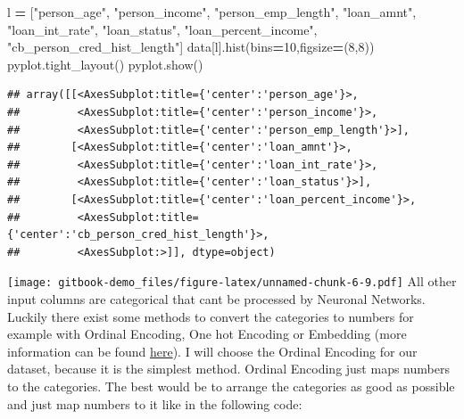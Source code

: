 \documentclass[
]{book}
\newenvironment{Shaded}{\begin{snugshade}}{\end{snugshade}}
\newcommand{\DecValTok}[1]{\textcolor[rgb]{0.00,0.00,0.81}{#1}}
\newcommand{\NormalTok}[1]{#1}
\newcommand{\OperatorTok}[1]{\textcolor[rgb]{0.81,0.36,0.00}{\textbf{#1}}}
\newcommand{\StringTok}[1]{\textcolor[rgb]{0.31,0.60,0.02}{#1}}
\begin{document}
\begin{Shaded}
\begin{Highlighting}[]
\NormalTok{l }\OperatorTok{=}\NormalTok{ [}\StringTok{"person\_age"}\NormalTok{, }\StringTok{"person\_income"}\NormalTok{, }\StringTok{"person\_emp\_length"}\NormalTok{, }\StringTok{"loan\_amnt"}\NormalTok{, }\StringTok{"loan\_int\_rate"}\NormalTok{, }\StringTok{"loan\_status"}\NormalTok{, }\StringTok{"loan\_percent\_income"}\NormalTok{, }\StringTok{"cb\_person\_cred\_hist\_length"}\NormalTok{]}
\NormalTok{data[l].hist(bins}\OperatorTok{=}\DecValTok{10}\NormalTok{,figsize}\OperatorTok{=}\NormalTok{(}\DecValTok{8}\NormalTok{,}\DecValTok{8}\NormalTok{))}
\NormalTok{pyplot.tight\_layout()}
\NormalTok{pyplot.show()}
\end{Highlighting}
\end{Shaded}

\begin{verbatim}
## array([[<AxesSubplot:title={'center':'person_age'}>,
##         <AxesSubplot:title={'center':'person_income'}>,
##         <AxesSubplot:title={'center':'person_emp_length'}>],
##        [<AxesSubplot:title={'center':'loan_amnt'}>,
##         <AxesSubplot:title={'center':'loan_int_rate'}>,
##         <AxesSubplot:title={'center':'loan_status'}>],
##        [<AxesSubplot:title={'center':'loan_percent_income'}>,
##         <AxesSubplot:title={'center':'cb_person_cred_hist_length'}>,
##         <AxesSubplot:>]], dtype=object)
\end{verbatim}

\texttt{[image: gitbook-demo\_files/figure-latex/unnamed-chunk-6-9.pdf]}
All other input columns are categorical that cant be processed by Neuronal Networks. Luckily there exist some methods to convert the categories to numbers for example with Ordinal Encoding, One hot Encoding or Embedding (more information can be found \href{https://machinelearningmastery.com/how-to-prepare-categorical-data-for-deep-learning-in-python/}{here}). I will choose the Ordinal Encoding for our dataset, because it is the simplest method. Ordinal Encoding just maps numbers to the categories. The best would be to arrange the categories as good as possible and just map numbers to it like in the following code:
\end{document}
